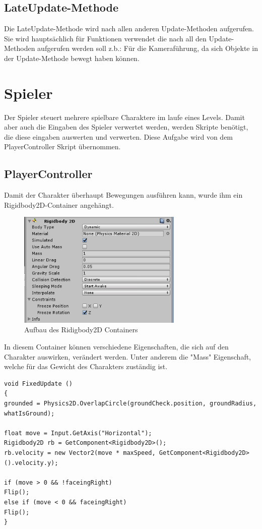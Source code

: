 \subsection{LateUpdate-Methode}
Die LateUpdate-Methode wird nach allen anderen Update-Methoden aufgerufen. Sie wird hauptsächlich für Funktionen verwendet die nach all den Update-Methoden aufgerufen werden soll z.b.: Für die Kameraführung, da sich Objekte in der Update-Methode bewegt haben können.
\section{Spieler}
Der Spieler steuert mehrere spielbare Charaktere im laufe  eines Levels. Damit aber auch die Eingaben des Spieler verwertet werden, werden Skripte benötigt, die diese eingaben auswerten und verwerten. Diese Aufgabe wird von dem PlayerController Skript übernommen. 
\subsection{PlayerController}
Damit der Charakter überhaupt Bewegungen ausführen kann, wurde ihm ein Rigidbody2D-Container angehängt.
\begin{figure}[htbp] 
	\centering
	\includegraphics[width=0.7\textwidth]{images/Ridigbody2D.png}
	\caption{Aufbau des Ridigbody2D Containers}
\end{figure}
In diesem Container können verschiedene Eigenschaften, die sich auf den Charakter auswirken, verändert werden. Unter anderem die "Mass" Eigenschaft, welche für das Gewicht des Charakters zuständig ist.

\begin{lstlisting}[language={[Sharp]C}]
void FixedUpdate ()
{
grounded = Physics2D.OverlapCircle(groundCheck.position, groundRadius, whatIsGround);

float move = Input.GetAxis("Horizontal");
Rigidbody2D rb = GetComponent<Rigidbody2D>();
rb.velocity = new Vector2(move * maxSpeed, GetComponent<Rigidbody2D>().velocity.y);

if (move > 0 && !faceingRight)
Flip();
else if (move < 0 && faceingRight)
Flip();
}
\end{lstlisting}

